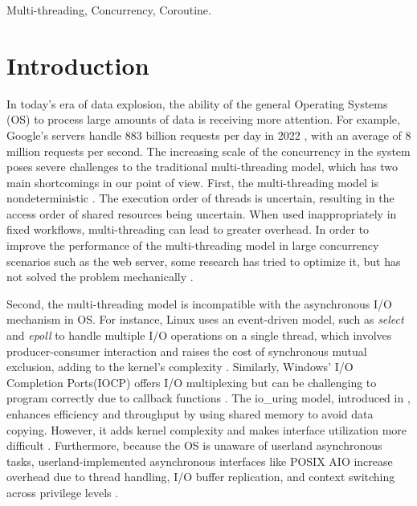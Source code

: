 \documentclass[conference]{IEEEtran}
\begin{document}
\begin{IEEEkeywords}
Multi-threading, Concurrency, Coroutine.
\end{IEEEkeywords}

\section{Introduction}
\label{section: introduction}

In today's era of data explosion, the ability of the general Operating Systems (OS) to process large amounts of data is receiving more attention. For example, Google's servers handle 883 billion requests per day in 2022 \cite{google-search-statistics}, with an average of 8 million requests per second. The increasing scale of the concurrency in the system poses severe challenges to the traditional multi-threading model, which has two main shortcomings in our point of view. First, the multi-threading model is nondeterministic \cite{Lee:EECS-2006-1}. The execution order of threads is uncertain, resulting in the access order of shared resources being uncertain. When used inappropriately in fixed workflows, multi-threading can lead to greater overhead. In order to improve the performance of the multi-threading model in large concurrency scenarios such as the web server, some research has tried to optimize it, but has not solved the problem mechanically \cite{li_combining_2007, howell_cooperative_2002}.

Second, the multi-threading model is incompatible with the asynchronous I/O mechanism in OS. For instance, Linux uses an event-driven model, such as \textit{select} and \textit{epoll} to handle multiple I/O operations on a single thread, which involves producer-consumer interaction and raises the cost of synchronous mutual exclusion, adding to the kernel's complexity \cite{Gammo2004ComparingAE}. Similarly, Windows' I/O Completion Ports(IOCP) \cite{alvinashcraft_io_2022} offers I/O multiplexing but can be challenging to program correctly due to callback functions \cite{callbackhell}. The io\_uring model, introduced in \cite{io_uring}, enhances efficiency and throughput by using shared memory to avoid data copying. However, it adds kernel complexity and makes interface utilization more difficult \cite{li2021pm}. Furthermore, because the OS is unaware of userland asynchronous tasks, userland-implemented asynchronous interfaces like POSIX AIO increase overhead due to thread handling, I/O buffer replication, and context switching across privilege levels \cite{jones2006boost}.
\end{document}
